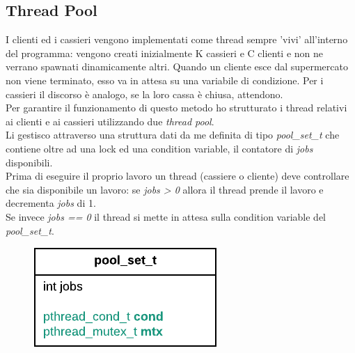 \documentclass[11pt, a4paper]{article}
\begin{document}
\subsection{Thread Pool}
I clienti ed i cassieri vengono implementati come thread sempre 'vivi' all'interno del programma: vengono creati inizialmente K cassieri e C clienti e non ne verrano spawnati dinamicamente altri. Quando un cliente esce dal supermercato non viene terminato, esso va in attesa su una variabile di condizione. Per i cassieri il discorso è analogo, se la loro cassa è chiusa, attendono.\\
Per garantire il funzionamento di questo metodo ho strutturato i thread relativi ai clienti e ai cassieri utilizzando due \textit{thread pool}. \\Li gestisco attraverso una struttura dati da me definita di tipo \textit{pool\_set\_t} che contiene oltre ad una lock ed una condition variable, il contatore di \textit{jobs} disponibili.\\
Prima di eseguire il proprio lavoro un thread (cassiere o cliente) deve controllare che sia disponibile un lavoro: se \textit{jobs > 0} allora il thread prende il lavoro e decrementa \textit{jobs} di 1. \\ Se invece \textit{jobs == 0} il thread si mette in attesa sulla condition variable del \textit{pool\_set\_t}.
\begin{figure}[h]
	\centering
	\includegraphics[scale=1]{pool_res.png}
	\label{fig:0}
\end{figure}
\end{document}
